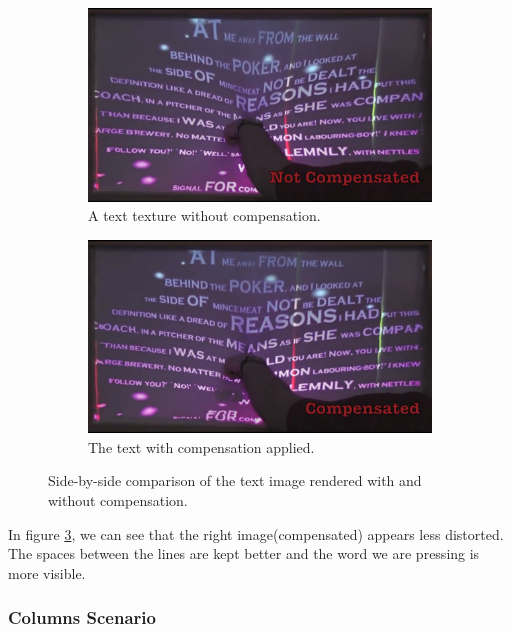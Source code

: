 \documentclass[]{article}
\begin{document}
\begin{figure}[!h]
\centering
\begin{subfigure}{.5\textwidth}
  \centering
  \includegraphics[width=0.9\linewidth]{figures/compensation/TextNotCompensated.png}
  \caption{A text texture without compensation.}
  \label{fig:TextNotCompensated}
\end{subfigure}%
\begin{subfigure}{.5\textwidth}
  \centering
  \includegraphics[width=0.9\linewidth]{figures/compensation/TextCompensated.png}
  \caption{The text with compensation applied.}
  \label{fig:TextCompensated}
\end{subfigure}
\caption{Side-by-side comparison of the text image rendered with and without compensation.}
\label{fig:TextComparison}
\end{figure}

In figure \ref{fig:TextComparison}, we can see that the right image(compensated) appears less distorted. The spaces between the lines are kept better and the word we are pressing is more visible.

\subsubsection{Columns Scenario}
\end{document}
